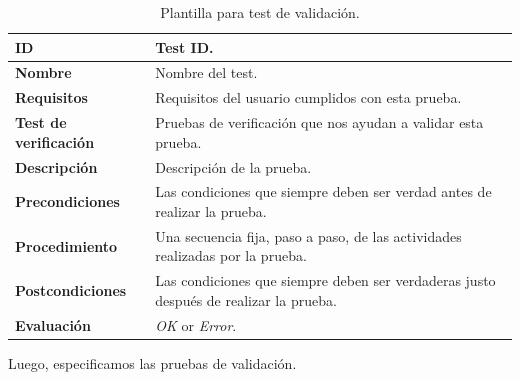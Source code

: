 \begin{center}
\begin{table}[htb]
\centering
\begin{tabular}{@{}p{2.5cm} p{9cm}@{}} 
\toprule
\textbf{ID} 					& Test ID. \\
\midrule
\textbf{Nombre} 				& Nombre del test. \\
\midrule
\textbf{Requisitos} 		& Requisitos del usuario cumplidos con esta prueba. \\
\midrule
\textbf{Test de verificación} 	& Pruebas de verificación que nos ayudan a validar esta prueba. \\
\midrule
\textbf{Descripción} 		& Descripción de la prueba. \\
\midrule
\textbf{Precondiciones}		& Las condiciones que siempre deben ser verdad antes de realizar la prueba. \\
\midrule
\textbf{Procedimiento}			& Una secuencia fija, paso a paso, de las actividades realizadas por la prueba. \\
\midrule
\textbf{Postcondiciones} 		& Las condiciones que siempre deben ser verdaderas justo después de realizar la prueba. \\
\midrule
\textbf{Evaluación} 			& \textit{OK} or \textit{Error}. \\
\bottomrule
\end{tabular}
\caption{Plantilla para test de validación.}
\label{tab:validation_tests}
\end{table}
\end{center}


Luego, especificamos las pruebas de validación.


